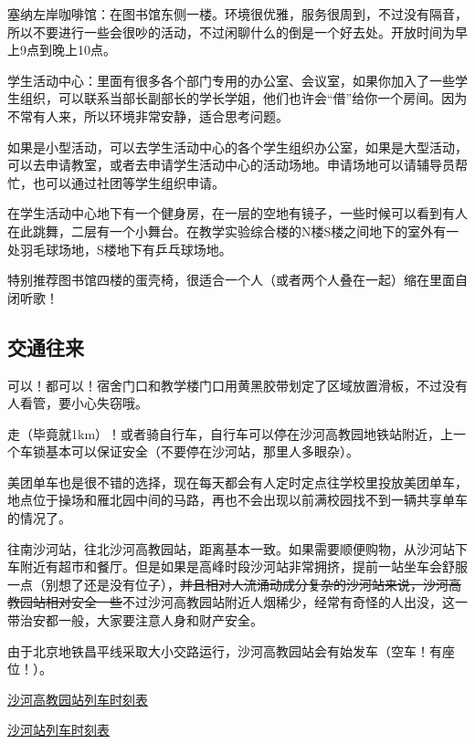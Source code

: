 塞纳左岸咖啡馆：在图书馆东侧一楼。环境很优雅，服务很周到，不过没有隔音，所以不要进行一些会很吵的活动，不过闲聊什么的倒是一个好去处。开放时间为早上9点到晚上10点。

学生活动中心：里面有很多各个部门专用的办公室、会议室，如果你加入了一些学生组织，可以联系当部长副部长的学长学姐，他们也许会“借”给你一个房间。因为不常有人来，所以环境非常安静，适合思考问题。


如果是小型活动，可以去学生活动中心的各个学生组织办公室，如果是大型活动，可以去申请教室，或者去申请学生活动中心的活动场地。申请场地可以请辅导员帮忙，也可以通过社团等学生组织申请。

在学生活动中心地下有一个健身房，在一层的空地有镜子，一些时候可以看到有人在此跳舞，二层有一个小舞台。在教学实验综合楼的N楼S楼之间地下的室外有一处羽毛球场地，S楼地下有乒乓球场地。


特别推荐图书馆四楼的蛋壳椅，很适合一个人（或者两个人叠在一起）缩在里面自闭听歌！

\subsection{交通往来}


可以！都可以！宿舍门口和教学楼门口用黄黑胶带划定了区域放置滑板，不过没有人看管，要小心失窃哦。


走（毕竟就1km）！或者骑自行车，自行车可以停在沙河高教园地铁站附近，上一个车锁基本可以保证安全（不要停在沙河站，那里人多眼杂）。

美团单车也是很不错的选择，现在每天都会有人定时定点往学校里投放美团单车，地点位于操场和雁北园中间的马路，再也不会出现以前满校园找不到一辆共享单车的情况了。


往南沙河站，往北沙河高教园站，距离基本一致。如果需要顺便购物，从沙河站下车附近有超市和餐厅。但是如果是高峰时段沙河站非常拥挤，提前一站坐车会舒服一点（别想了还是没有位子），\sout{并且相对人流涌动成分复杂的沙河站来说，沙河高教园站相对安全一些}不过沙河高教园站附近人烟稀少，经常有奇怪的人出没，这一带治安都一般，大家要注意人身和财产安全。

由于北京地铁昌平线采取大小交路运行，沙河高教园站会有始发车（空车！有座位！）。

\href{https://www.bjsubway.com/station/xltcx/linecp/2013-08-26/246.html?sk=1}{沙河高教园站列车时刻表}

\href{https://www.bjsubway.com/station/xltcx/linecp/2013-08-26/249.html?sk=1}{沙河站列车时刻表}
